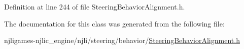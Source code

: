 Definition at line 244 of file Steering\+Behavior\+Alignment.\+h.



The documentation for this class was generated from the following file\+:\begin{DoxyCompactItemize}
\item 
njligames-\/njlic\+\_\+engine/njli/steering/behavior/\mbox{\hyperlink{_steering_behavior_alignment_8h}{Steering\+Behavior\+Alignment.\+h}}\end{DoxyCompactItemize}
